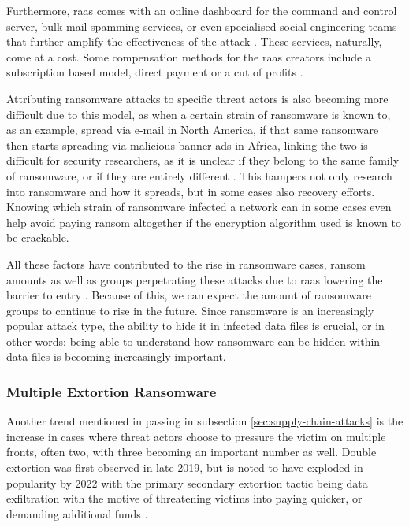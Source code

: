 Furthermore, \acrshort{raas} comes with an online dashboard for the command and control server, bulk mail spamming
services, or even specialised social engineering teams that further amplify the effectiveness of the attack
\cite{social-engineering-ransomware-vector}. These services, naturally, come at a cost. Some compensation methods
for the \acrshort{raas} creators include a subscription based model, direct payment or a cut of profits
\cite[p.~44-45]{enisa_threat_landscape, ransomware-book}.

Attributing ransomware attacks to specific threat actors is also becoming more difficult due to this model,
as when a certain strain of ransomware is known to, as an example, spread via e-mail in North America,
if that same ransomware then starts spreading via malicious banner ads in Africa, linking the two is difficult
for security researchers, as it is unclear if they belong to the same family of ransomware, or if they are 
entirely different \cite[p.~47]{ransomware-book}. This hampers not only research into ransomware and how it
spreads, but in some cases also recovery efforts. Knowing which strain of ransomware infected a network can
in some cases even help avoid paying ransom altogether if the encryption algorithm used is known to be
crackable.

All these factors have contributed to the rise in ransomware cases, ransom amounts as well as groups
perpetrating these attacks due to \acrshort{raas} lowering the barrier to entry \cite{unit42-ransomware}.
Because of this, we can expect the amount of ransomware groups to continue to rise in the future. Since ransomware
is an increasingly popular attack type, the ability to hide it in infected data files is crucial, or in other words:
being able to understand how ransomware can be hidden within data files is becoming increasingly important.

\subsubsection{Multiple Extortion Ransomware}
Another trend mentioned in passing in subsection \ref{sec:supply-chain-attacks} is the increase in cases where
threat actors choose to pressure the victim on multiple fronts, often two, with three becoming an important
number as well. Double extortion was first observed in late 2019, but is noted to have exploded in popularity
by 2022 with the primary secondary extortion tactic being data exfiltration with the motive of threatening victims
into paying quicker, or demanding additional funds \cite{unit42-ransomware, multiple-extortion-ransomware}. 


